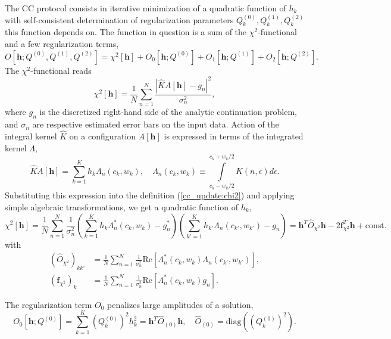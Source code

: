 \documentclass[]{article}
\begin{document}
The CC protocol consists in iterative minimization of a quadratic function of $h_k$ with self-consistent determination of regularization parameters $Q^{(0)}_k, Q^{(1)}_k, Q^{(2)}_k$ this function depends on. The function in question is a sum of the $\chi^2$-functional and a few regularization terms,
\begin{equation}
    O[\mathbf{h}; Q^{(0)},Q^{(1)},Q^{(2)}] = \chi^2[\mathbf{h}]
     + O_0[\mathbf{h};Q^{(0)}]
     + O_1[\mathbf{h};Q^{(1)}]
     + O_2[\mathbf{h};Q^{(2)}].
\end{equation}
The $\chi^2$-functional reads
\begin{equation}\label{cc_update:chi2}
    \chi^2[\mathbf{h}] = \frac{1}{N} \sum_{n=1}^{N}
        \frac{|\hat K A[\mathbf{h}] - g_n|^2}{\sigma^2_n},
\end{equation}
where $g_n$ is the discretized right-hand side of the analytic continuation problem, and $\sigma_n$ are respective estimated error bars on the input data. Action of the integral kernel $\hat K$ on a configuration $A[\mathbf{h}]$ is expressed in terms of the integrated kernel $\Lambda$,
\begin{equation}
    \hat K A[\mathbf{h}] = \sum_{k=1}^K h_k \Lambda_n(c_k, w_k), \quad
    \Lambda_n(c_k, w_k) \equiv
    \int\limits_{c_k-w_k/2}^{c_k+w_k/2} K(n,\epsilon) d\epsilon.
\end{equation}
Substituting this expression into the definition (\ref{cc_update:chi2}) and applying simple algebraic transformations, we get a quadratic function of $h_k$,
\begin{equation}
    \chi^2[\mathbf{h}] =
    \frac{1}{N} \sum_{n=1}^N \frac{1}{\sigma_n^2}
    \left(\sum_{k=1}^K h_k \Lambda_n^*(c_k, w_k) - g^*_n\right)
    \left(\sum_{k'=1}^K h_{k'} \Lambda_n(c_{k'}, w_{k'}) - g_n\right) =
    \mathbf{h}^T \hat O_{\chi^2} \mathbf{h}
    -2\mathbf{f}^T_{\chi^2} \mathbf{h} + \mathrm{const}.
\end{equation}
with
\begin{align}
    (\hat O_{\chi^2})_{kk'} &= \frac{1}{N} \sum_{n=1}^N \frac{1}{\sigma_n^2}
        \mathrm{Re}\left[
        \Lambda^*_n(c_k, w_k) \Lambda_n(c_{k'}, w_{k'})
        \right],\\
    (\mathbf{f}_{\chi^2})_k &= \frac{1}{N} \sum_{n=1}^N \frac{1}{\sigma_n^2}
        \mathrm{Re}\left[\Lambda^*_n(c_k, w_k) g_n\right].
\end{align}

The regularization term $O_0$ penalizes large amplitudes of a solution,
\begin{equation}
    O_0[\mathbf{h};Q^{(0)}] = \sum_{k=1}^K (Q^{(0)}_k)^2 h_k^2 =
        \mathbf{h}^T \hat O_{(0)} \mathbf{h}, \quad
        \hat O_{(0)} = \mathrm{diag}((Q^{(0)}_k)^2).
\end{equation}
\end{document}
